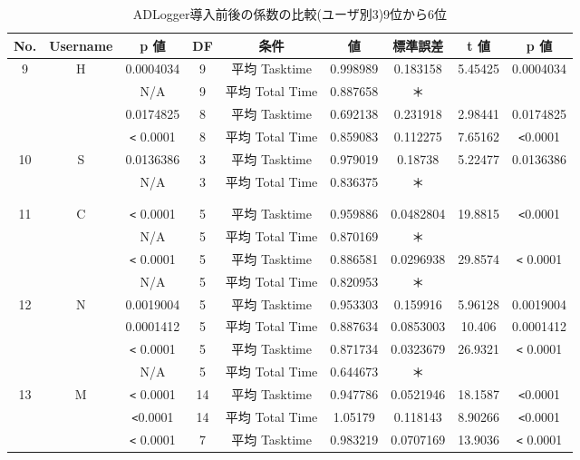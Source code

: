 \begin{table}[ht]
\begin{center}
 \caption{ADLogger導入前後の係数の比較(ユーザ別3)9位から6位}
\begin{tabular}{|c|c|c|c|c|c|c|c|c|} \hline
No. & Username & p 値 & DF & 条件 & 値 & 標準誤差 & t 値 & p 値 \\\hline
9 & H & 0.0004034 & 9 & 平均 Tasktime & 0.998989 & 0.183158 & 5.45425 & 0.0004034 \\\hline
 &  & N/A & 9 & 平均 Total Time & 0.887658 & ＊ &  & \\\hline
 &  & 0.0174825 & 8 & 平均 Tasktime & 0.692138 & 0.231918 & 2.98441 & 0.0174825 \\\hline
 &  & \verb|<| 0.0001 & 8 & 平均 Total Time & 0.859083 & 0.112275 & 7.65162 & \verb|<|0.0001 \\\hline
10 & S & 0.0136386 & 3 & 平均 Tasktime & 0.979019 & 0.18738 & 5.22477 & 0.0136386 \\\hline
 &  & N/A & 3 & 平均 Total Time & 0.836375 & ＊ &  & \\\hline
 &  &  &  &  &  &  &  &  \\\hline
 &  &  &  &  &  &  &  &  \\\hline
11 & C & \verb|<| 0.0001 & 5 & 平均 Tasktime & 0.959886 & 0.0482804 & 19.8815 & \verb|<|0.0001\\\hline
 &  & N/A & 5 & 平均 Total Time & 0.870169 & ＊ &  &  \\\hline
 &  & \verb|<| 0.0001 & 5 & 平均 Tasktime & 0.886581 & 0.0296938 & 29.8574 &\verb|<| 0.0001\\\hline
 &  & N/A & 5 & 平均 Total Time & 0.820953 & ＊ &  & \\\hline
12 & N & 0.0019004 & 5 & 平均 Tasktime & 0.953303 & 0.159916 & 5.96128 & 0.0019004 \\\hline
 &  & 0.0001412 & 5 & 平均 Total Time & 0.887634 & 0.0853003 & 10.406 & 0.0001412 \\\hline
 &  & \verb|<| 0.0001 & 5 & 平均 Tasktime & 0.871734 & 0.0323679 & 26.9321 & \verb|<| 0.0001 \\\hline
 &  & N/A & 5 & 平均 Total Time & 0.644673 & ＊ &  & \\\hline
13 & M &\verb|<| 0.0001 & 14 & 平均 Tasktime & 0.947786 & 0.0521946 & 18.1587 & \verb|<|0.0001 \\\hline
 &  & \verb|<|0.0001 & 14 & 平均 Total Time & 1.05179 & 0.118143 & 8.90266 & \verb|<|0.0001\\\hline
 &  & \verb|<| 0.0001 & 7 & 平均 Tasktime & 0.983219 & 0.0707169 & 13.9036 & \verb|<| 0.0001 \\\hline

\end{tabular}
\end{center}
\end{table}
